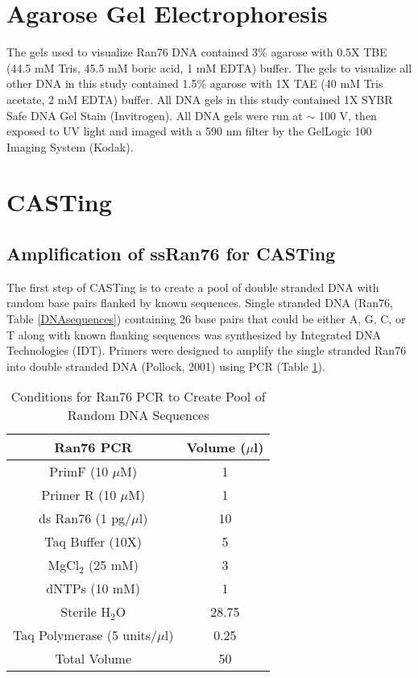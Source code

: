 \documentclass[12pt,twoside]{reedthesis}
\begin{document}
   \section{Agarose Gel Electrophoresis}
   
   The gels used to visualize Ran76 DNA contained 3\% agarose with 0.5X TBE (44.5 mM Tris, 45.5 mM boric acid, 1 mM EDTA) buffer. The gels to visualize all other DNA in this study contained 1.5\% agarose with 1X TAE (40 mM Tris acetate, 2 mM EDTA) buffer. All DNA gels in this study contained 1X SYBR\textsuperscript{\textregistered} Safe DNA Gel Stain (Invitrogen). All DNA gels were run at $\sim$ 100 V, then exposed to UV light and imaged with a 590 nm filter by the GelLogic 100 Imaging System (Kodak). 
   
   \section{CASTing}
   
   \subsection{Amplification of ssRan76 for CASTing}
   The first step of CASTing is to create a pool of double stranded DNA with random base pairs flanked by known sequences. Single stranded DNA (Ran76, Table \ref{DNAsequences}) containing 26 base pairs that could be either A, G, C, or T along with known flanking sequences was synthesized by Integrated DNA Technologies (IDT). Primers were designed to amplify the single stranded Ran76 into double stranded DNA (Pollock, 2001) using PCR (Table \ref{Ran76PCR}). 
   
    
\begin{table}[H]
	\caption[Ran76 PCR Conditions]{Conditions for Ran76 PCR to Create Pool of Random DNA Sequences} 
	\centering
	\label{Ran76PCR}
	\begin{tabular}{|c | c|}
		\hline
		Ran76 PCR & Volume ($\mu$l) \\
		\hline 
		PrimF (10 $\mu$M) & 1    \\ 
		Primer R (10 $\mu$M) & 1   \\  			
		ds Ran76 (1 pg/$\mu$l) & 10   \\
		Taq Buffer (10X) & 5  \\ 
		MgCl$_{2}$ (25 mM) & 3 \\  
		dNTPs (10 mM) & 1 \\     
		Sterile H$_{2}$O & 28.75  \\
		Taq Polymerase (5 units/$\mu$l) & 0.25  \\
		\hline   
		Total Volume & 50   \\
		\hline
	\end{tabular}
\end{table}
\end{document}
